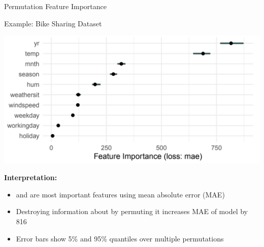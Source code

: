 \documentclass[10pt,compress,t,notes=noshow, xcolor=table]{beamer}
\begin{document}
\begin{frame}{Permutation Feature Importance}
\begin{itemize}
  \end{itemize}
\end{frame}

\begin{frame}{Example: Bike Sharing Dataset}

\begin{center}
\includegraphics[width=\textwidth]{figure_man/bike-sharing02.png}
\end{center}

\textbf{Interpretation:}

\begin{itemize}
 \item {} and  are most important features using mean absolute error (MAE)
 \item Destroying information about  by permuting it increases MAE of model by 816
 \item Error bars show 5\% and 95\% quantiles over multiple permutations
\end{itemize}
\end{frame}
\end{document}

